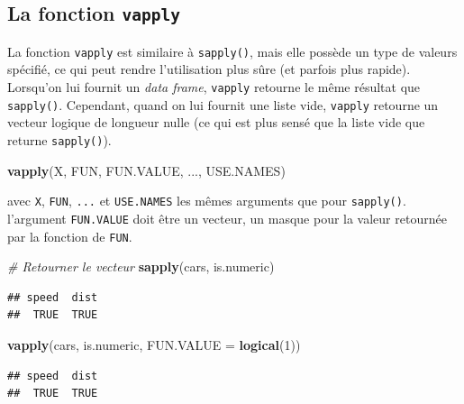 \documentclass[
  11pt,
]{book}
\newenvironment{Shaded}{\begin{snugshade}}{\end{snugshade}}
\newcommand{\CommentTok}[1]{\textcolor[rgb]{0.56,0.35,0.01}{\textit{#1}}}
\newcommand{\DataTypeTok}[1]{\textcolor[rgb]{0.13,0.29,0.53}{#1}}
\newcommand{\DecValTok}[1]{\textcolor[rgb]{0.00,0.00,0.81}{#1}}
\newcommand{\KeywordTok}[1]{\textcolor[rgb]{0.13,0.29,0.53}{\textbf{#1}}}
\newcommand{\NormalTok}[1]{#1}
\numberwithin{equation}{section}
\numberwithin{countremarque}{section}
\begin{document}
\hypertarget{boucles_vectorisation_apply_vapply}{%
\subsection{\texorpdfstring{La fonction \texttt{vapply}}{La fonction vapply}}\label{boucles_vectorisation_apply_vapply}}

La fonction \texttt{vapply} est similaire à \texttt{sapply()}, mais elle possède un type de valeurs spécifié, ce qui peut rendre l'utilisation plus sûre (et parfois plus rapide). Lorsqu'on lui fournit un \emph{data frame}, \texttt{vapply} retourne le même résultat que \texttt{sapply()}. Cependant, quand on lui fournit une liste vide, \texttt{vapply} retourne un vecteur logique de longueur nulle (ce qui est plus sensé que la liste vide que returne \texttt{sapply()}).

\begin{Shaded}
\begin{Highlighting}[]
\KeywordTok{vapply}\NormalTok{(X, FUN, FUN.VALUE, ..., USE.NAMES)}
\end{Highlighting}
\end{Shaded}

avec \texttt{X}, \texttt{FUN}, \texttt{...} et \texttt{USE.NAMES} les mêmes arguments que pour \texttt{sapply()}. l'argument \texttt{FUN.VALUE} doit être un vecteur, un masque pour la valeur retournée par la fonction de \texttt{FUN}.

\begin{Shaded}
\begin{Highlighting}[]
\CommentTok{\# Retourner le vecteur }
\KeywordTok{sapply}\NormalTok{(cars, is.numeric)}
\end{Highlighting}
\end{Shaded}

\begin{lstlisting}
## speed  dist 
##  TRUE  TRUE
\end{lstlisting}

\begin{Shaded}
\begin{Highlighting}[]
\KeywordTok{vapply}\NormalTok{(cars, is.numeric, }\DataTypeTok{FUN.VALUE =} \KeywordTok{logical}\NormalTok{(}\DecValTok{1}\NormalTok{))}
\end{Highlighting}
\end{Shaded}

\begin{lstlisting}
## speed  dist 
##  TRUE  TRUE
\end{lstlisting}
\end{document}
